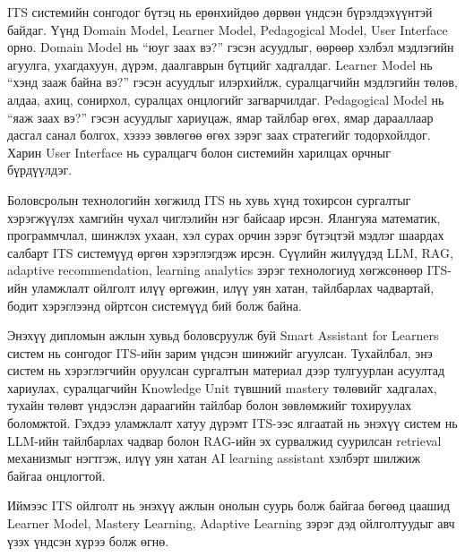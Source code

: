 \documentclass[12pt,A4]{report}
\newcommand{\eng}[1]{#1}
\begin{document}
\eng{ITS} системийн сонгодог бүтэц нь ерөнхийдөө дөрвөн үндсэн бүрэлдэхүүнтэй байдаг. Үүнд \eng{Domain Model}, \eng{Learner Model}, \eng{Pedagogical Model}, \eng{User Interface} орно. \eng{Domain Model} нь ``юуг заах вэ?'' гэсэн асуудлыг, өөрөөр хэлбэл мэдлэгийн агуулга, ухагдахуун, дүрэм, даалгаврын бүтцийг хадгалдаг. \eng{Learner Model} нь ``хэнд зааж байна вэ?'' гэсэн асуудлыг илэрхийлж, суралцагчийн мэдлэгийн төлөв, алдаа, ахиц, сонирхол, суралцах онцлогийг загварчилдаг. \eng{Pedagogical Model} нь ``яаж заах вэ?'' гэсэн асуудлыг хариуцаж, ямар тайлбар өгөх, ямар дарааллаар дасгал санал болгох, хэзээ зөвлөгөө өгөх зэрэг заах стратегийг тодорхойлдог. Харин \eng{User Interface} нь суралцагч болон системийн харилцах орчныг бүрдүүлдэг.

Боловсролын технологийн хөгжилд \eng{ITS} нь хувь хүнд тохирсон сургалтыг хэрэгжүүлэх хамгийн чухал чиглэлийн нэг байсаар ирсэн. Ялангуяа математик, программчлал, шинжлэх ухаан, хэл сурах орчин зэрэг бүтэцтэй мэдлэг шаардах салбарт \eng{ITS} системүүд өргөн хэрэглэгдэж ирсэн. Сүүлийн жилүүдэд \eng{LLM}, \eng{RAG}, \eng{adaptive recommendation}, \eng{learning analytics} зэрэг технологиуд хөгжсөнөөр \eng{ITS}-ийн уламжлалт ойлголт илүү өргөжин, илүү уян хатан, тайлбарлах чадвартай, бодит хэрэглээнд ойртсон системүүд бий болж байна.

Энэхүү дипломын ажлын хувьд боловсруулж буй \eng{Smart Assistant for Learners} систем нь сонгодог \eng{ITS}-ийн зарим үндсэн шинжийг агуулсан. Тухайлбал, энэ систем нь хэрэглэгчийн оруулсан сургалтын материал дээр тулгуурлан асуултад хариулах, суралцагчийн \eng{Knowledge Unit} түвшний \eng{mastery} төлөвийг хадгалах, тухайн төлөвт үндэслэн дараагийн тайлбар болон зөвлөмжийг тохируулах боломжтой. Гэхдээ уламжлалт хатуу дүрэмт \eng{ITS}-ээс ялгаатай нь энэхүү систем нь \eng{LLM}-ийн тайлбарлах чадвар болон \eng{RAG}-ийн эх сурвалжид суурилсан retrieval механизмыг нэгтгэж, илүү уян хатан \eng{AI learning assistant} хэлбэрт шилжиж байгаа онцлогтой.

Иймээс \eng{ITS} ойлголт нь энэхүү ажлын онолын суурь болж байгаа бөгөөд цаашид \eng{Learner Model}, \eng{Mastery Learning}, \eng{Adaptive Learning} зэрэг дэд ойлголтуудыг авч үзэх үндсэн хүрээ болж өгнө.



\end{document}
